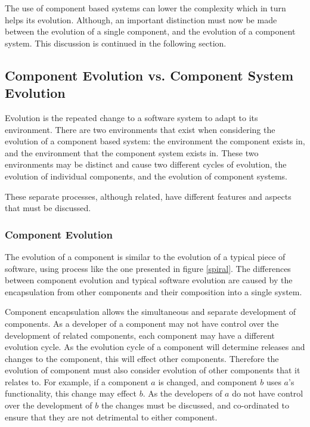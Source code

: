 The use of component based systems can lower the complexity which in turn helps its evolution.
Although, an important distinction must now be made between the evolution of a single component, and the evolution of a component system.
This discussion is continued in the following section.

\subsection{Component Evolution vs. Component System Evolution}
Evolution is the repeated change to a software system to adapt to its environment.
There are two environments that exist when considering the evolution of a component based system:
the environment the component exists in, and the environment that the component system exists in.
These two environments may be distinct and cause two different cycles of evolution, the evolution of individual components, and the evolution of component systems.

These separate processes, although related, have different features and aspects that must be discussed.

\subsubsection{Component Evolution}
The evolution of a component is similar to the evolution of a typical piece of software, using process like the one presented in figure \ref{spiral}.
The differences between component evolution and typical software evolution are caused by the encapsulation from other components and their composition into a single system.

Component encapsulation allows the simultaneous and separate development of components.
As a developer of a component may not have control over the development of related components, each component may have a different evolution cycle.
As the evolution cycle of a component will determine releases and changes to the component, this will effect other components.
Therefore the evolution of component must also consider evolution of other components that it relates to.
For example, if a component $a$ is changed, and component $b$ uses $a$'s functionality, this change may effect $b$.
As the developers of $a$ do not have control over the development of $b$ the changes must be discussed, and co-ordinated to ensure that they are not detrimental to either component.

